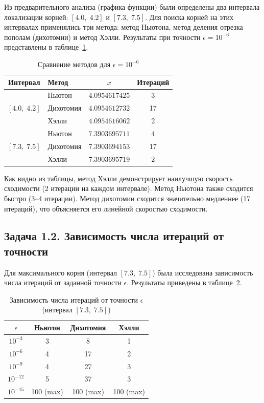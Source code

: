 \documentclass[a4paper]{article}
\begin{document}
Из предварительного анализа (графика функции) были определены два интервала локализации корней: $[4.0,\;4.2]$ и $[7.3,\;7.5]$. Для поиска корней на этих интервалах применялись три метода: метод Ньютона, метод деления отрезка пополам (дихотомии) и метод Хэлли. Результаты при точности $\epsilon = 10^{-6}$ представлены в таблице~\ref{tab:task1_1}.

\begin{table}[H]
\centering
\caption{Сравнение методов для $\epsilon = 10^{-6}$}
\label{tab:task1_1}
\begin{tabular}{|c|l|c|c|}
\hline
Интервал & Метод & $x$ & Итераций \\
\hline
\multirow{3}{*}{$[4.0,\;4.2]$}
& Ньютон      & $4.0954617425$ & 3 \\
& Дихотомия   & $4.0954612732$ & 17 \\
& Хэлли       & $4.0954616062$ & 2 \\
\hline
\multirow{3}{*}{$[7.3,\;7.5]$}
& Ньютон      & $7.3903695711$ & 4 \\
& Дихотомия   & $7.3903694153$ & 17 \\
& Хэлли       & $7.3903695719$ & 2 \\
\hline
\end{tabular}
\end{table}

Как видно из таблицы, метод Хэлли демонстрирует наилучшую скорость сходимости (2 итерации на каждом интервале). Метод Ньютона также сходится быстро (3--4 итерации). Метод дихотомии сходится значительно медленнее (17 итераций), что объясняется его линейной скоростью сходимости.

\subsection*{Задача 1.2. Зависимость числа итераций от точности}

Для максимального корня (интервал $[7.3,\;7.5]$) была исследована зависимость числа итераций от заданной точности $\epsilon$. Результаты приведены в таблице~\ref{tab:task1_2}.

\begin{table}[H]
\centering
\caption{Зависимость числа итераций от точности $\epsilon$ (интервал $[7.3,\;7.5]$)}
\label{tab:task1_2}
\begin{tabular}{|c|c|c|c|}
\hline
$\epsilon$ & Ньютон & Дихотомия & Хэлли \\
\hline
$10^{-3}$  & 3  & 8  & 1 \\
$10^{-6}$  & 4  & 17 & 2 \\
$10^{-9}$  & 4  & 27 & 3 \\
$10^{-12}$ & 5  & 37 & 3 \\
$10^{-15}$ & 100 (max) & 100 (max) & 100 (max) \\
\hline
\end{tabular}
\end{table}
\end{document}
